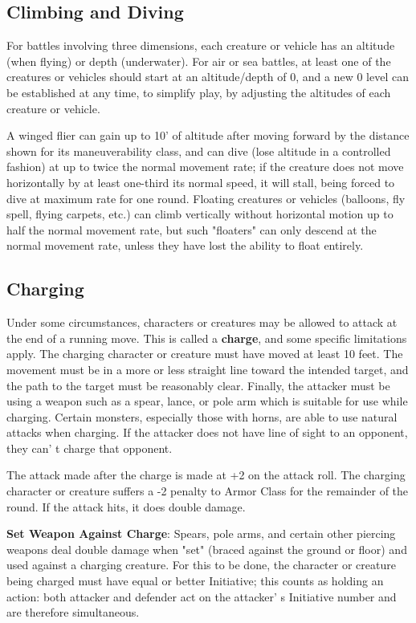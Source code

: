 \documentclass[a4paper,twoside,openany,10pt]{book}
\begin{document}
\begin{multicols}{2}
\subsection{Climbing and Diving}\label{climbing-and-diving}

For battles involving three dimensions, each creature or vehicle has an altitude (when flying) or depth (underwater). For air or sea battles, at least one of the creatures or vehicles should start at an altitude/depth of 0, and a new 0 level can be established at any time, to simplify play, by adjusting the altitudes of each creature or vehicle.

A winged flier can gain up to 10' of altitude after moving forward by the distance shown for its maneuverability class, and can dive (lose altitude in a controlled fashion) at up to twice the normal movement rate; if the creature does not move horizontally by at least one-third its normal speed, it will stall, being forced to dive at maximum rate for one round. Floating creatures or vehicles (balloons, fly spell, flying carpets, etc.) can climb vertically without horizontal motion up to half the normal movement rate, but such "floaters" can only descend at the normal movement rate, unless they have lost the ability to float entirely.

\subsection{Charging}\label{charging}

Under some circumstances, characters or creatures may be allowed to attack at the end of a running move. This is called a\textbf{ charge}, and some specific limitations apply. The charging character or creature must have moved at least 10 feet. The movement must be in a more or less straight line toward the intended target, and the path to the target must be reasonably clear. Finally, the attacker must be using a weapon such as a spear, lance, or pole arm which is suitable for use while charging. Certain monsters, especially those with horns, are able to use natural attacks when charging. If the attacker does not have line of sight to an opponent, they can' t charge that opponent.

The attack made after the charge is made at +2 on the attack roll. The charging character or creature suffers a -2 penalty to Armor Class for the remainder of the round. If the attack hits, it does double damage.

\textbf{Set Weapon Against Charge}: Spears, pole arms, and certain other piercing weapons deal double damage when "set" (braced against the ground or floor) and used against a charging creature. For this to be done, the character or creature being charged must have equal or better Initiative; this counts as holding an action: both attacker and defender act on the attacker' s Initiative number and are therefore simultaneous.


\end{multicols}
\end{document}
